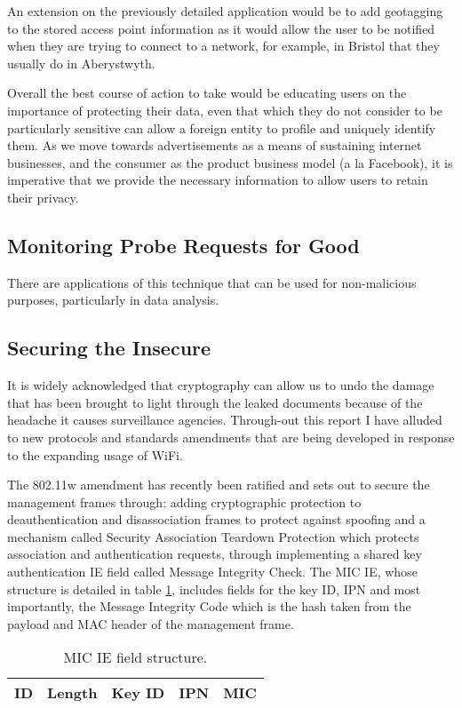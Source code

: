 An extension on the previously detailed application would be to add geotagging to the stored access point information as it would allow the user to be notified when they are trying to connect to a network, for example, in Bristol that they usually do in Aberystwyth.

Overall the best course of action to take would be educating users on the importance of protecting their data, even that which they do not consider to be particularly sensitive can allow a foreign entity to profile and uniquely identify them. As we move towards advertisements as a means of sustaining internet businesses, and the consumer as the product business model (a la Facebook), it is imperative that we provide the necessary information to allow users to retain their privacy. 
\newpage
\subsection{Monitoring Probe Requests for Good}
\label{conclusion:for-good}
There are applications of this technique that can be used for non-malicious purposes, particularly in data analysis.

\subsection{Securing the Insecure}

It is widely acknowledged that cryptography can allow us to undo the damage that has been brought to light through the leaked documents because of the headache it causes surveillance agencies. Through-out this report I have alluded to new protocols and standards amendments that are being developed in response to the expanding usage of WiFi. 

The 802.11w amendment has recently been ratified and sets out to secure the management frames through: adding cryptographic protection to deauthentication and disassociation frames to protect against spoofing and a mechanism called Security Association Teardown Protection which protects association and authentication requests, through implementing a shared key authentication IE field called  Message Integrity Check. The MIC IE, whose structure is detailed in table \ref{tbl:mic}, includes fields for the key ID, IPN and most importantly, the Message Integrity Code which is the hash taken from the payload and MAC header of the management frame. 

\begin{table}[h!]
\begin{center}
	\begin{tabular}{|  p{2cm} |  p{2cm} | p{2cm} | p{2cm} | p{2cm} |}
		\hline
		ID & Length & Key ID & IPN & MIC\\ 
		\hline
	\end{tabular}
\end{center}
\caption{MIC IE field structure.}
\label{tbl:mic}
\end{table}

